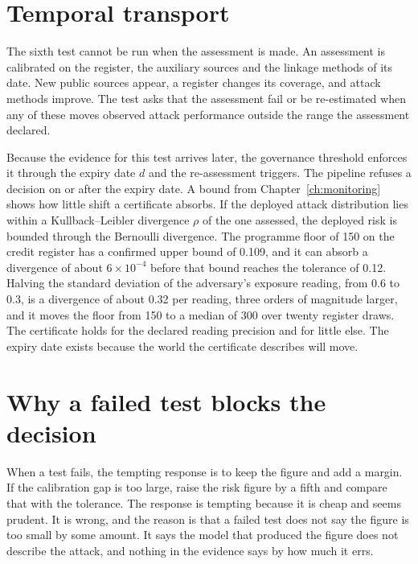 \section{Temporal transport}

The sixth test cannot be run when the assessment is made. An assessment is
calibrated on the register, the auxiliary sources and the linkage methods of its
date. New public sources appear, a register changes its coverage, and attack methods
improve. The test asks that the assessment fail or be re-estimated when any of these
moves observed attack performance outside the range the assessment declared.

Because the evidence for this test arrives later, the governance threshold enforces
it through the expiry date $d$ and the re-assessment triggers. The pipeline refuses
a decision on or after the expiry date. %
A bound from Chapter~\ref{ch:monitoring} shows how little shift a certificate absorbs.
If the deployed attack distribution lies within a Kullback--Leibler divergence $\rho$
of the one assessed, the deployed risk is bounded through the Bernoulli divergence.
The programme floor of 150 on the credit register has a confirmed upper bound of
0.109, and it can absorb a divergence of about $6 \times 10^{-4}$ before that bound
reaches the tolerance of 0.12. %
Halving the standard deviation of the adversary's exposure reading, from 0.6 to
0.3, is a divergence of about 0.32 per reading, three orders of magnitude larger,
and it moves the floor from 150 to a median of 300 over twenty register draws.
The certificate holds for the declared reading precision and for little else. The
expiry date exists because the world the certificate describes will move.

\section{Why a failed test blocks the decision}

When a test fails, the tempting response is to keep the figure and add a margin. If
the calibration gap is too large, raise the risk figure by a fifth and compare that
with the tolerance. The response is tempting because it is cheap and seems prudent.
It is wrong, and the reason is that a failed test does not say the figure is too
small by some amount. It says the model that produced the figure does not describe
the attack, and nothing in the evidence says by how much it errs.

